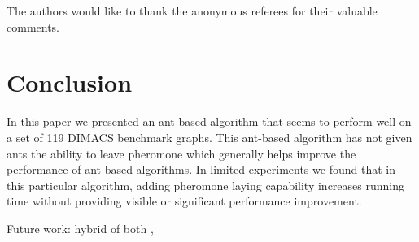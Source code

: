 \documentclass[11pt]{article}
\begin{document}
The authors would like to thank the anonymous referees for their valuable comments.

\section{Conclusion}\label{conclusion}


  
In this paper we presented an ant-based algorithm that seems to perform well
on a set of 119 DIMACS benchmark graphs.  This ant-based algorithm has not given ants
the ability to leave pheromone which generally helps improve the performance
of ant-based algorithms.  In limited experiments we found that in this
particular algorithm, adding pheromone laying capability increases
running time without providing visible or significant performance
improvement. 

Future work: hybrid of both , 





\end{document}
